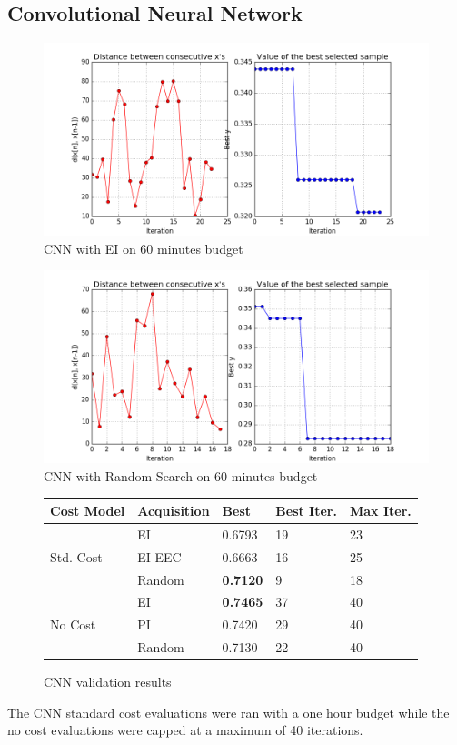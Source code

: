 \documentclass[letterpaper]{article}
\begin{document}
\subsection {Convolutional Neural Network}
\begin{figure}[!h]
	\includegraphics[width=\linewidth]{EIX_CNN_X_init2_STD_ITER60min_v2.png}
	\caption{CNN with EI on 60 minutes budget}
\end{figure}
\begin{figure}[!h]
	\includegraphics[width=\linewidth]{RAND_CNN_X_init2_STD_ITER60min_v2.png}
	\caption{CNN with Random Search on 60 minutes budget}
\end{figure}
\begin{figure}[!h]
\begin{center}
	\begin{tabular}{lllll}
		\hline
		Cost Model & Acquisition & Best & Best Iter. & Max Iter.\\
		\hline
		\multirow{3}{*}{Std. Cost} & EI &  0.6793 & 19 & 23\\
		& EI-EEC & 0.6663 & 16 & 25\\
		& Random & \textbf{0.7120} & 9 & 18\\
		\hline
		\multirow{4}{*}{No Cost} & EI & \textbf{0.7465} & 37 & 40\\
		& PI & 0.7420 & 29 & 40\\
		& Random & 0.7130 & 22 & 40\\
		\hline
	\end{tabular}
\end{center}
	\caption{CNN validation results}
\end{figure}
The CNN standard cost evaluations were ran with a one hour budget while the no cost evaluations were capped at a maximum of 40 iterations.
\end{document}
